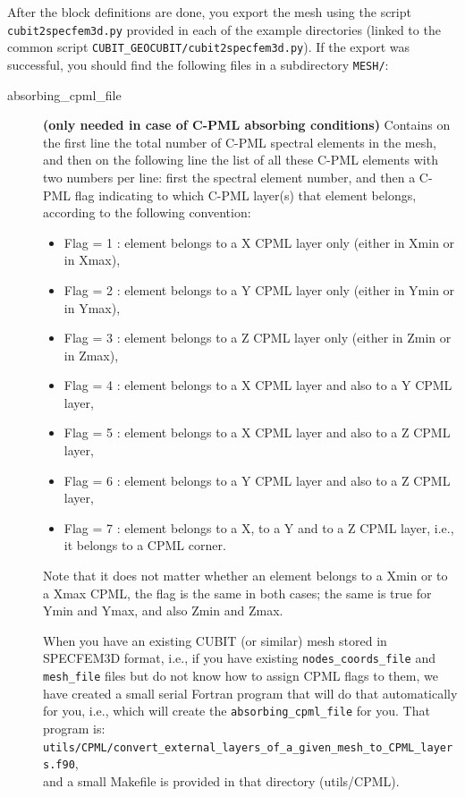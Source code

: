 After the block definitions are done, you export the mesh using the
script \texttt{cubit2specfem3d.py} provided in each of the example
directories (linked to the common script \texttt{CUBIT\_GEOCUBIT/cubit2specfem3d.py}).
If the export was successful, you should find the following
files in a subdirectory \texttt{MESH/}:
\begin{description}
\item [{absorbing\_cpml\_file}] \textbf{(only needed in case of C-PML absorbing
conditions)} Contains on the first line the total number of C-PML
spectral elements in the mesh, and then on the following line the
list of all these C-PML elements with two numbers per line: first
the spectral element number, and then a C-PML flag indicating to which
C-PML layer(s) that element belongs, according to the following convention:

\begin{itemize}
\item Flag = 1 : element belongs to a X CPML layer only (either in Xmin or in Xmax),
\item Flag = 2 : element belongs to a Y CPML layer only (either in Ymin or in Ymax),
\item Flag = 3 : element belongs to a Z CPML layer only (either in Zmin or in Zmax),
\item Flag = 4 : element belongs to a X CPML layer and also to a Y CPML layer,
\item Flag = 5 : element belongs to a X CPML layer and also to a Z CPML layer,
\item Flag = 6 : element belongs to a Y CPML layer and also to a Z CPML layer,
\item Flag = 7 : element belongs to a X, to a Y and to a Z CPML layer, i.e., it belongs to a CPML corner.
\end{itemize}

Note that it does not matter whether an element belongs to a Xmin
or to a Xmax CPML, the flag is the same in both cases; the same is
true for Ymin and Ymax, and also Zmin and Zmax.


When you have an existing CUBIT (or similar) mesh stored in SPECFEM3D
format, i.e., if you have existing \texttt{nodes\_coords\_file}
and \texttt{mesh\_file} files but do not know
how to assign CPML flags to them, we have created a small serial Fortran
program that will do that automatically for you, i.e., which will
create the \texttt{absorbing\_cpml\_file} for
you. That program is: \\
\texttt{utils/CPML/convert\_external\_layers\_of\_a\_given\_mesh\_to\_CPML\_layers.f90},\\
and a small Makefile is provided in that directory (utils/CPML).



\end{description}
